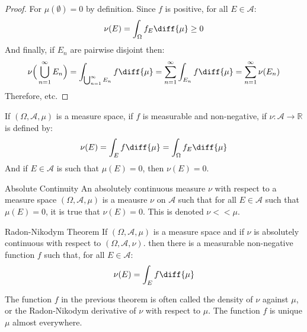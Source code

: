    \begin{proof}
        For $\mu(\emptyset)=0$ by definition. Since $f$ is positive,
        for all $E\in\mathcal{A}$:
        \begin{equation}
            \nu(E)=\int_{\Omega}f_{E}\diff{\mu}\geq{0}
        \end{equation}
        And finally, if $E_{n}$ are pairwise disjoint then:
        \begin{equation}
            \nu\Big(\bigcup_{n=1}^{\infty}E_{n}\Big)=
            \int_{\bigcup_{n=1}^{\infty}E_{n}}f\diff{\mu}
            =\sum_{n=1}^{\infty}\int_{E_{n}}f\diff{\mu}
            =\sum_{n=1}^{\infty}\nu(E_{n})
        \end{equation}
        Therefore, etc.
    \end{proof}
    \begin{theorem}
        If $(\Omega,\mathcal{A},\mu)$ is a measure space,
        if $f$ is measurable and non-negative, if
        $\nu:\mathcal{A}\rightarrow\mathbb{R}$ is defined by:
        \begin{equation}
            \nu(E)=\int_{E}f\diff{\mu}=
            \int_{\Omega}f_{E}\diff{\mu}
        \end{equation}
        And if $E\in\mathcal{A}$ is such that $\mu(E)=0$, then
        $\nu(E)=0$.
    \end{theorem}
    \begin{ldefinition}{Absolute Continuity}
        An absolutely continuous measure $\nu$ with respect
        to a measure space $(\Omega,\mathcal{A},\mu)$ is a meausre
        $\nu$ on $\mathcal{A}$ such that for all $E\in\mathcal{A}$
        such that $\mu(E)=0$, it is true that $\nu(E)=0$. This is
        denoted $\nu<<\mu$.
    \end{ldefinition}
    \begin{ltheorem}{Radon-Nikodym Theorem}
        If $(\Omega,\mathcal{A},\mu)$ is a measure space and if
        $\nu$ is absolutely continuous with respect to
        $(\Omega,\mathcal{A},\nu)$. then there is a measurable
        non-negative function $f$ such that, for all $E\in\mathcal{A}$:
        \begin{equation}
            \nu(E)=\int_{E}f\diff{\mu}
        \end{equation}
    \end{ltheorem}
    The function $f$ in the previous theorem is often called the
    density of $\nu$ against $\mu$, or the
    Radon-Nikodym derivative of $\nu$ with respect to $\mu$. The
    function $f$ is unique $\mu$ almost everywhere.
